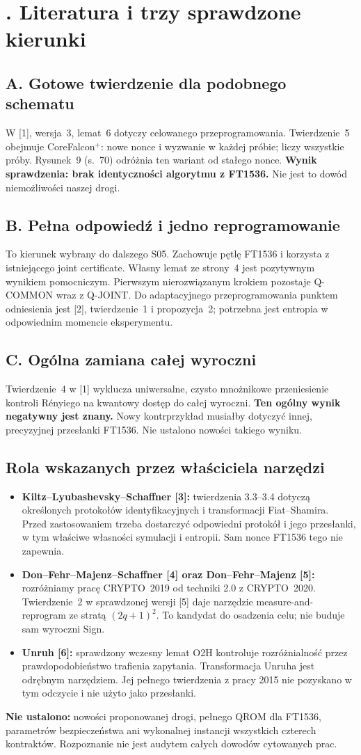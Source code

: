 \documentclass[10pt,a4paper]{article}
\newcommand{\head}[1]{\section*{\color{ink}\sffamily #1}}
\newcommand{\subhead}[1]{\subsection*{\color{ink}\sffamily #1}}
\begin{document}
\newpage
\head{6. Literatura i trzy sprawdzone kierunki}
\subhead{A. Gotowe twierdzenie dla podobnego schematu}
W [1], wersja~3, lemat~6 dotyczy celowanego przeprogramowania. Twierdzenie~5 obejmuje CoreFalcon$^+$: nowe nonce i wyzwanie w każdej próbie; liczy wszystkie próby. Rysunek~9 (s.~70) odróżnia ten wariant od stałego nonce. \textbf{Wynik sprawdzenia: brak identyczności algorytmu z FT1536.} Nie jest to dowód niemożliwości naszej drogi.

\subhead{B. Pełna odpowiedź i jedno reprogramowanie}
To kierunek wybrany do dalszego S05. Zachowuje pętlę FT1536 i korzysta z istniejącego joint certificate. Własny lemat ze strony~4 jest pozytywnym wynikiem pomocniczym. Pierwszym nierozwiązanym krokiem pozostaje Q-COMMON wraz z Q-JOINT. Do adaptacyjnego przeprogramowania punktem odniesienia jest [2], twierdzenie~1 i propozycja~2; potrzebna jest entropia w odpowiednim momencie eksperymentu.

\subhead{C. Ogólna zamiana całej wyroczni}
Twierdzenie~4 w [1] wyklucza uniwersalne, czysto mnożnikowe przeniesienie kontroli Rényiego na kwantowy dostęp do całej wyroczni. \textbf{Ten ogólny wynik negatywny jest znany.} Nowy kontrprzykład musiałby dotyczyć innej, precyzyjnej przesłanki FT1536. Nie ustalono nowości takiego wyniku.

\subhead{Rola wskazanych przez właściciela narzędzi}
\begin{itemize}
\item \textbf{Kiltz--Lyubashevsky--Schaffner [3]:} twierdzenia 3.3--3.4 dotyczą określonych protokołów identyfikacyjnych i transformacji Fiat--Shamira. Przed zastosowaniem trzeba dostarczyć odpowiedni protokół i jego przesłanki, w tym właściwe własności symulacji i entropii. Sam nonce FT1536 tego nie zapewnia.
\item \textbf{Don--Fehr--Majenz--Schaffner [4] oraz Don--Fehr--Majenz [5]:} rozróżniamy pracę CRYPTO~2019 od techniki 2.0 z CRYPTO~2020. Twierdzenie~2 w sprawdzonej wersji [5] daje narzędzie measure-and-reprogram ze stratą $(2q+1)^2$. To kandydat do osadzenia celu; nie buduje sam wyroczni Sign.
\item \textbf{Unruh [6]:} sprawdzony wczesny lemat O2H kontroluje rozróżnialność przez prawdopodobieństwo trafienia zapytania. Transformacja Unruha jest odrębnym narzędziem. Jej pełnego twierdzenia z pracy 2015 nie pozyskano w tym odczycie i nie użyto jako przesłanki.
\end{itemize}
\textbf{Nie ustalono:} nowości proponowanej drogi, pełnego QROM dla FT1536, parametrów bezpieczeństwa ani wykonalnej instancji wszystkich czterech kontraktów. Rozpoznanie nie jest audytem całych dowodów cytowanych prac.
\end{document}
